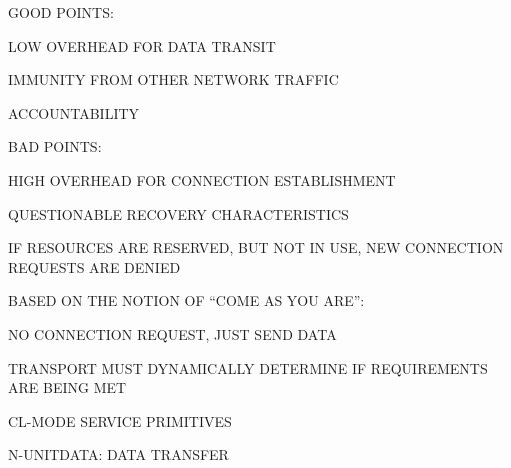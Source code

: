 \begin{bwslide}

\begin{nrtc}
\item	GOOD POINTS:
    \begin{nrtc}
    \item	LOW OVERHEAD FOR DATA TRANSIT

    \item	IMMUNITY FROM OTHER NETWORK TRAFFIC

    \item	ACCOUNTABILITY
    \end{nrtc}

\item	BAD POINTS:
    \begin{nrtc}
    \item	HIGH OVERHEAD FOR CONNECTION ESTABLISHMENT

    \item	QUESTIONABLE RECOVERY CHARACTERISTICS

    \item	IF RESOURCES ARE RESERVED, BUT NOT IN USE,
		NEW CONNECTION REQUESTS ARE DENIED
    \end{nrtc}
\end{nrtc}
\end{bwslide}


\begin{bwslide}

\begin{nrtc}
\item	BASED ON THE NOTION OF ``COME AS YOU ARE'':
    \begin{nrtc}
    \item	NO CONNECTION REQUEST, JUST SEND DATA

    \item	TRANSPORT MUST DYNAMICALLY DETERMINE IF REQUIREMENTS ARE
		BEING MET
    \end{nrtc}

\item	CL-MODE SERVICE PRIMITIVES
    \begin{nrtc}
    \item	N-UNITDATA: DATA TRANSFER
    \end{nrtc}
\end{nrtc}
\end{bwslide}


